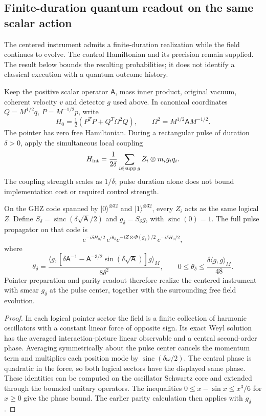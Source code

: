 \subsection{Finite-duration quantum readout on the same scalar action}
\label{sec:source-scalar-finite-instrument}

The centered instrument admits a finite-duration realization while the field
continues to evolve. The control Hamiltonian and its precision remain supplied.
The result below bounds the resulting probabilities; it does not identify a
classical execution with a quantum outcome history.

Keep the positive scalar operator $\mathsf A$, mass inner product, original
vacuum, coherent velocity $v$ and detector $g$ used above. In canonical
coordinates $Q=M^{1/2}q$, $P=M^{-1/2}p$, write
\[
 H_0=\tfrac12(P^TP+Q^T\Omega^2Q),\qquad
 \Omega^2=M^{1/2}\mathsf A M^{-1/2}.
\]
The pointer has zero free Hamiltonian. During a rectangular pulse of duration
$\delta>0$, apply the simultaneous local coupling
\[
 H_{\rm int}=\frac1{2\delta}\sum_{i\in\operatorname{supp}g}
 Z_i\otimes m_i g_iq_i.
\]
The coupling strength scales as $1/\delta$; pulse duration alone does not
bound implementation cost or required control strength.

\begin{proposition}
\label{prop:source-scalar-finite-pulse}
On the GHZ code spanned by $|0\rangle^{\otimes32}$ and
$|1\rangle^{\otimes32}$, every $Z_i$ acts as the same logical $Z$.
Define $S_\delta=\operatorname{sinc}(\delta\sqrt{\mathsf A}/2)$ and
$g_\delta=S_\delta g$, with $\operatorname{sinc}(0)=1$. The full pulse
propagator on that code is
\[
 e^{-i\delta H_0/2}\,e^{i\theta_\delta}
 e^{-iZ\otimes\Phi(g_\delta)/2}\,e^{-i\delta H_0/2},
\]
where
\[
 \theta_\delta=
 \frac{\langle g,[\delta\mathsf A^{-1}
 -\mathsf A^{-3/2}\sin(\delta\sqrt{\mathsf A})]g\rangle_M}{8\delta^2},
 \qquad 0\le\theta_\delta\le\frac{\delta\langle g,g\rangle_M}{48}.
\]
Pointer preparation and parity readout therefore realize the centered
instrument with smear $g_\delta$ at the pulse center, together with the
surrounding free field evolution.
\end{proposition}
\begin{proof}
In each logical pointer sector the field is a finite collection of harmonic
oscillators with a constant linear force of opposite sign. Its exact Weyl
solution has the averaged interaction-picture linear observable and a central
second-order phase. Averaging symmetrically about the pulse center cancels
the momentum term and multiplies each position mode by
$\operatorname{sinc}(\delta\omega/2)$. The central phase is quadratic in
the force, so both logical sectors have the displayed same phase. These
identities can be computed on the oscillator Schwartz core and extended
through the bounded unitary operators. The inequalities
$0\le x-\sin x\le x^3/6$ for $x\ge0$ give the phase bound.
The earlier parity calculation then applies with $g_\delta$.
\end{proof}

